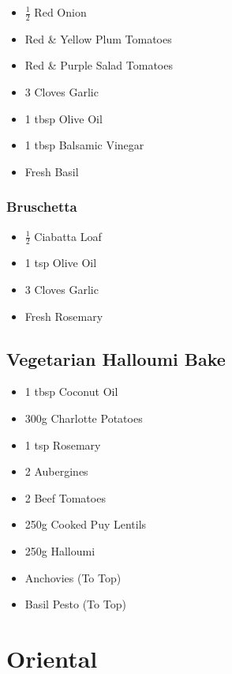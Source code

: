 \documentclass[11pt, english]{article}
\begin{document}
	\begin{itemize}
        \setlength\itemsep{0cm}
		\item $\frac{1}{2}$ Red Onion
		\item Red \& Yellow Plum Tomatoes
		\item Red \& Purple Salad Tomatoes
		\item 3 Cloves Garlic
		\item 1 tbsp Olive Oil
		\item 1 tbsp Balsamic Vinegar
		\item Fresh Basil
        \end{itemize}

		\subsubsection*{Bruschetta}

	\begin{itemize}
        \setlength\itemsep{0cm}
		\item $\frac{1}{2}$ Ciabatta Loaf
		\item 1 tsp Olive Oil
		\item 3 Cloves Garlic
		\item Fresh Rosemary
        \end{itemize}

\newpage

	\subsection{Vegetarian Halloumi Bake}

	\begin{itemize}
        \setlength\itemsep{0cm}
                \item 1 tbsp Coconut Oil
		\item 300g Charlotte Potatoes
		\item 1 tsp Rosemary
		\item 2 Aubergines
		\item 2 Beef Tomatoes
		\item 250g Cooked Puy Lentils
		\item 250g Halloumi
		\item Anchovies (To Top)
		\item Basil Pesto (To Top)
        \end{itemize}

\newpage

\section{Oriental}
\end{document}
